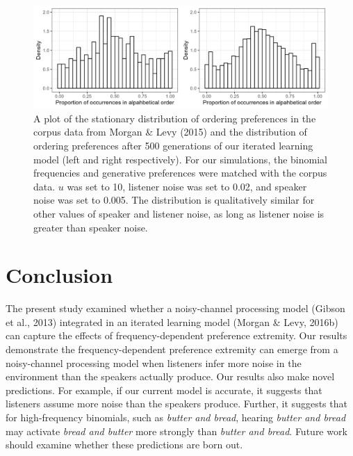 \documentclass[10pt, letterpaper]{article}
\newenvironment{CodeChunk}{}{}
\begin{document}
\begin{CodeChunk}
\begin{figure}[!htb]

{\centering \includegraphics[width=1\linewidth]{Figures/corpus_plot_and_ours} 

}

\caption[A plot of the stationary distribution of ordering preferences in the corpus data from Morgan \& Levy (2015) and the distribution of ordering preferences after 500 generations of our iterated learning model (left and right respectively)]{A plot of the stationary distribution of ordering preferences in the corpus data from Morgan \& Levy (2015) and the distribution of ordering preferences after 500 generations of our iterated learning model (left and right respectively). For our simulations, the binomial frequencies and generative preferences were matched with the corpus data. $
u$ was set to 10, listener noise was set to 0.02, and speaker noise was set to 0.005. The distribution is qualitatively similar for other values of speaker and listener noise, as long as listener noise is greater than speaker noise.}\label{fig:corpusourmodel}
\end{figure}
\end{CodeChunk}

\hypertarget{conclusion}{%
\section{Conclusion}\label{conclusion}}

The present study examined whether a noisy-channel processing model
(Gibson et al., 2013) integrated in an iterated learning model (Morgan
\& Levy, 2016b) can capture the effects of frequency-dependent
preference extremity. Our results demonstrate the frequency-dependent
preference extremity can emerge from a noisy-channel processing model
when listeners infer more noise in the environment than the speakers
actually produce. Our results also make novel predictions. For example,
if our current model is accurate, it suggests that listeners assume more
noise than the speakers produce. Further, it suggests that for
high-frequency binomials, such as \emph{butter and bread}, hearing
\emph{butter and bread} may activate \emph{bread and butter} more
strongly than \emph{butter and bread}. Future work should examine
whether these predictions are born out.
\end{document}
